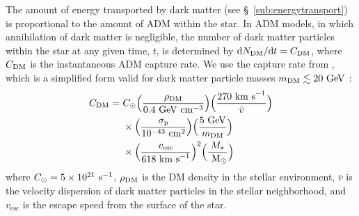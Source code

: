 \documentclass[useAMS,usenatbib]{mnras}
\begin{document}
The amount of energy transported by dark matter 
(see \S~\ref{sub:energytransport}) is proportional 
to the amount of ADM within the star. 
In ADM models, in which annihilation of dark matter is negligible, 
the number of dark matter particles within the star at any given time, 
$t$, is determined by ${\rm d}N_{\mathrm{DM}}/{\rm d}t = C_{\mathrm{DM}}$, 
where $C_{\mathrm{DM}}$ is the instantaneous ADM capture rate. 
We use the capture rate from \citet{Zentner2011AsymmetricDwarfs}, 
which is a simplified form valid for dark matter particle masses 
$m_{\mathrm{DM}} \lesssim 20 \ \mathrm{GeV}$ \citep[see][for more complete capture rates]{Gould1992CosmologicalAnnihilations,Zentner2009High-energySun}:
%
  \begin{align}
  \begin{split}
    \label{eq:capturerate}
    C_{\mathrm{DM}} =\ & C_{\odot}
    \Big(\frac{\rho_{\mathrm{DM}}}{0.4 \ \mathrm{GeV} \ \mathrm{cm}^{-3}}\Big)
    \Big(\frac{270 \ \mathrm{km\ s}^{-1}}{\bar{v}}\Big) \\
    & \times \Big(\frac{\sigma_{\mathrm{p}}}{10^{-43} \ \mathrm{cm}^2}\Big) \Big(\frac{5 \ \mathrm{GeV}}{m_{\mathrm{DM}}}\Big) \\
    & \times \Big(\frac{v_{\mathrm{esc}}}{618 \ \mathrm{km\ s}^{-1}}\Big)^2
    \Big(\frac{M_{\star}}{\ \mathrm{M}_{\odot}}\Big)
  \end{split}
  \end{align}
%
  where $C_{\odot} = 5 \times 10^{21} \ \mathrm{s}^{-1}$, 
  $\rho_{\mathrm{DM}}$ is the DM density in the stellar environment,
  $\bar{v}$ is the velocity dispersion of dark matter particles 
  in the stellar neighborhood, and $v_{\mathrm{esc}}$ is the escape speed from the 
  surface of the star.
\end{document}
